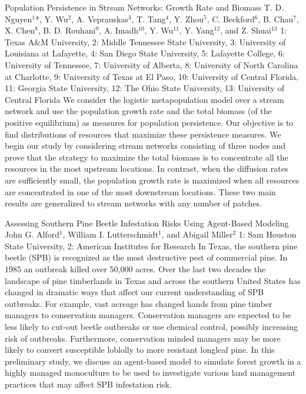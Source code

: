 \vspace{1.5ex}
\abs
{Population Persistence in Stream Networks: Growth Rate and Biomass}
{ T. D. Nguyen$^{1}$*, Y. Wu$^{2}$, A. Veprauskas$^{3}$, T. Tang$^{4}$, Y. Zhou$^{5}$, C. Beckford$^{6}$, B. Chau$^{7}$, X. Chen$^{8}$, B. D. Rouhani$^{9}$, A. Imadh$^{10}$, Y. Wu$^{11}$, Y. Yang$^{12}$, and Z. Shuai$^{13}$ } 
{1: Texas A$\&$M University, 2: Middle Tennessee State University, 3: University of Louisiana at Lafayette, 4: San Diego State University, 5: Lafayette College, 6: University of Tennessee, 7: University of Alberta, 8: University of North Carolina at Charlotte, 9: University of Texas at El Paso, 10: University of Central Florida, 11: Georgia State University, 12: The Ohio State University, 13: University of Central Florida}
{We consider the logistic metapopulation model over a stream network and use the population growth rate and the total biomass (of the positive equilibrium) as measures for population persistence. Our objective is to find distributions of resources that maximize these persistence measures. We begin our study by considering stream networks consisting of three nodes and prove that the strategy to maximize the total biomass is to concentrate all the resources in the most upstream locations. In contrast, when the diffusion rates are sufficiently small, the population growth rate is maximized when all resources are concentrated in one of the most downstream locations. These two main results are generalized to stream networks with any number of patches.}


\vspace{1.5ex}
\abs
{Assessing Southern Pine Beetle Infestation Risks Using Agent-Based Modeling}
{John G. Alford$^{1}$, William I. Lutterschmidt$^{1}$, and Abigail Miller$^{2}$}
{1: Sam Houston State University, 2: American Institutes for Research}
{In Texas, the southern pine beetle (SPB) is recognized as the most destructive pest of commercial pine. In 1985 an outbreak killed over 50,000 acres. Over the last two decades the landscape of pine timberlands in Texas and across the southern United States has changed in dramatic ways that affect our current understanding of SPB outbreaks. For example, vast acreage has changed hands from pine timber managers to conservation managers. Conservation managers are expected to be less likely to cut-out beetle outbreaks or use chemical control, possibly increasing risk of outbreaks. Furthermore, conservation minded managers may be more likely to convert susceptible loblolly to more resistant longleaf pine. In this preliminary study, we discuss an agent-based model to simulate forest growth in a highly managed monoculture to be used to investigate various land management practices that may affect SPB infestation risk.}



